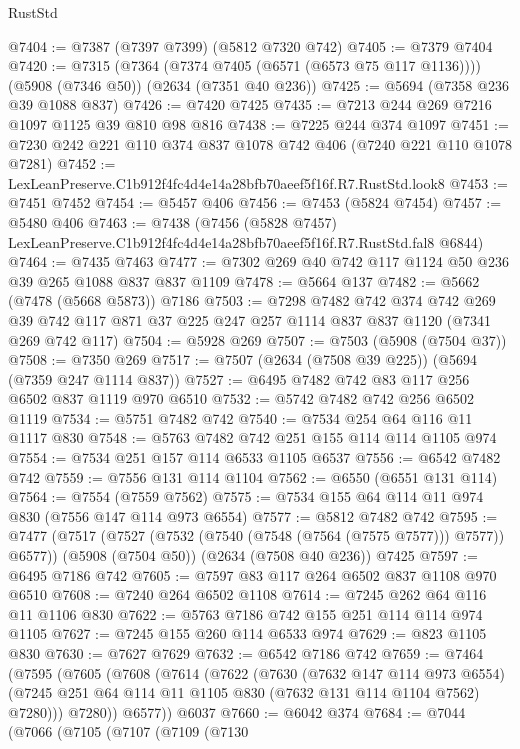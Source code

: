 \begin{lexlean}{RustStd}
\begin{coremodule}
@7404 := @7387 (@7397 @7399) (@5812 @7320 @742)
@7405 := @7379 @7404
@7420 := @7315
    (@7364 (@7374 @7405 (@6571 (@6573 @75 @117 @1136))))
    (@5908 (@7346 @50))
    (@2634 (@7351 @40 @236))
@7425 := @5694 (@7358 @236 @39 @1088 @837)
@7426 := @7420 @7425
@7435 := @7213 @244 @269 @7216 @1097 @1125 @39 @810 @98 @816
@7438 := @7225 @244 @374 @1097
@7451 := @7230 @242 @221 @110 @374 @837 @1078 @742 @406 (@7240 @221 @110 @1078 @7281)
@7452 := LexLeanPreserve.C1b912f4fc4d4e14a28bfb70aeef5f16f.R7.RustStd.look8
@7453 := @7451 @7452
@7454 := @5457 @406
@7456 := @7453 (@5824 @7454)
@7457 := @5480 @406
@7463 := @7438
    (@7456 (@5828 @7457) LexLeanPreserve.C1b912f4fc4d4e14a28bfb70aeef5f16f.R7.RustStd.fal8 @6844)
@7464 := @7435 @7463
@7477 := @7302 @269 @40 @742 @117 @1124 @50 @236 @39 @265 @1088 @837 @837 @1109
@7478 := @5664 @137
@7482 := @5662 (@7478 (@5668 @5873)) @7186
@7503 := @7298
    @7482
    @742
    @374
    @742
    @269
    @39
    @742
    @117
    @871
    @37
    @225
    @247
    @257
    @1114
    @837
    @837
    @1120
    (@7341 @269 @742 @117)
@7504 := @5928 @269
@7507 := @7503 (@5908 (@7504 @37))
@7508 := @7350 @269
@7517 := @7507 (@2634 (@7508 @39 @225)) (@5694 (@7359 @247 @1114 @837))
@7527 := @6495 @7482 @742 @83 @117 @256 @6502 @837 @1119 @970 @6510
@7532 := @5742 @7482 @742 @256 @6502 @1119
@7534 := @5751 @7482 @742
@7540 := @7534 @254 @64 @116 @11 @1117 @830
@7548 := @5763 @7482 @742 @251 @155 @114 @114 @1105 @974
@7554 := @7534 @251 @157 @114 @6533 @1105 @6537
@7556 := @6542 @7482 @742
@7559 := @7556 @131 @114 @1104
@7562 := @6550 (@6551 @131 @114)
@7564 := @7554 (@7559 @7562)
@7575 := @7534 @155 @64 @114 @11 @974 @830 (@7556 @147 @114 @973 @6554)
@7577 := @5812 @7482 @742
@7595 := @7477
    (@7517 (@7527 (@7532 (@7540 (@7548 (@7564 (@7575 @7577))) @7577)) @6577))
    (@5908 (@7504 @50))
    (@2634 (@7508 @40 @236))
    @7425
@7597 := @6495 @7186 @742
@7605 := @7597 @83 @117 @264 @6502 @837 @1108 @970 @6510
@7608 := @7240 @264 @6502 @1108
@7614 := @7245 @262 @64 @116 @11 @1106 @830
@7622 := @5763 @7186 @742 @155 @251 @114 @114 @974 @1105
@7627 := @7245 @155 @260 @114 @6533 @974
@7629 := @823 @1105 @830
@7630 := @7627 @7629
@7632 := @6542 @7186 @742
@7659 := @7464
    (@7595
      (@7605
        (@7608
          (@7614
            (@7622
              (@7630
                (@7632 @147 @114 @973 @6554)
                (@7245 @251 @64 @114 @11 @1105 @830 (@7632 @131 @114 @1104 @7562) @7280)))
            @7280))
        @6577))
    @6037
@7660 := @6042 @374
@7684 := @7044
    (@7066
      (@7105
        (@7107
          (@7109
            (@7130

\end{coremodule}
\end{lexlean}
